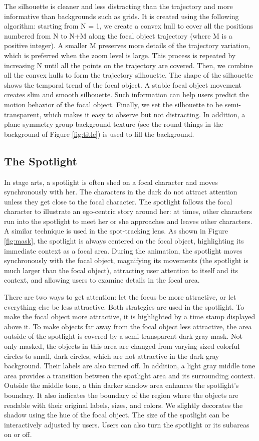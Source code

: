 \documentclass[review]{vgtc}                 %
\begin{document}
The silhouette is cleaner and less distracting than the trajectory and more informative than backgrounds such as grids. It is created using the following algorithm: starting from N = 1, we create a convex hull to cover all the positions numbered from N to N+M along the focal object trajectory (where M is a positive integer). A smaller M preserves more details of the trajectory variation, which is preferred when the zoom level is large. This process is repeated by increasing N until all the points on the trajectory are covered. Then, we combine all the convex hulls to form the trajectory silhouette. The shape of the silhouette shows the temporal trend of the focal object. A stable focal object movement creates slim and smooth silhouette. Such information can help users predict the motion behavior of the focal object. Finally, we set the silhouette to be semi-transparent, which makes it easy to observe but not distracting. In addition, a plane symmetry group background texture (see the round things  in the background of Figure \ref{fig:title}) is used to fill the background.

\subsection{The Spotlight}
In stage arts, a spotlight is often shed on a focal character and moves synchronously with her. The characters in the dark do not attract attention unless they get close to the focal character. The spotlight follows the focal character to illustrate an ego-centric story around her: at times, other characters run into the spotlight to meet her or she approaches and leaves other characters. A similar technique is used in the spot-tracking lens. As shown in Figure \ref{fig:mask}, the spotlight is always centered on the focal object, highlighting its immediate context as a focal area. During the animation, the spotlight moves synchronously with the focal object, magnifying its  movements (the spotlight is much larger than the focal object), attracting user attention to itself and its context, and allowing users to examine details in the focal area.

There are two ways to get attention: let the focus be more attractive, or let everything else be less attractive. Both strategies are used in the spotlight. To make the focal object more attractive, it is highlighted by a time stamp displayed above it. To make objects far away from the focal object less attractive, the area outside of the spotlight is covered by a semi-transparent dark gray mask. Not only masked, the objects in this area are changed from varying sized colorful circles to small, dark circles, which are not attractive in the dark gray background. Their labels are also turned off. In addition, a light gray middle tone area provides a transition between the spotlight area and its surrounding context. Outside the middle tone, a thin darker shadow area enhances the spotlight's boundary. It also indicates the boundary of the region where the objects are readable with their original labels, sizes, and colors. We slightly decorates the shadow using the hue of the focal object. The size of the spotlight can be interactively adjusted by users. Users can also turn the spotlight or its subareas on or off.
\end{document}
